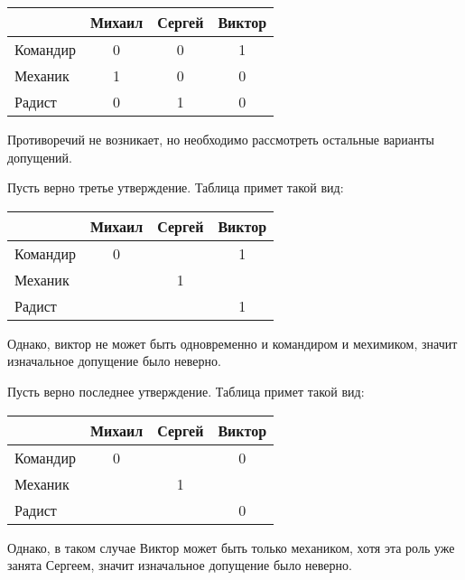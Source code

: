 \documentclass[12pt, a4paper]{article}
\begin{document}
  \begin{tabular}{|l|c|c|c|}
    \hline
             & Михаил & Сергей & Виктор \\ \hline
    Командир & 0      & 0      & 1      \\ \hline
    Механик  & 1      & 0      & 0      \\ \hline
    Радист   & 0      & 1      & 0      \\ \hline
  \end{tabular}

  \rule{0cm}{0.3cm}

  Противоречий не возникает, но необходимо рассмотреть остальные варианты допущений.

  Пусть верно третье утверждение. Таблица примет такой вид:

  \rule{0cm}{0.3cm}

  \begin{tabular}{|l|c|c|c|}
    \hline
             & Михаил & Сергей & Виктор \\ \hline
    Командир & 0      &        & 1      \\ \hline
    Механик  &        & 1      &        \\ \hline
    Радист   &        &        & 1      \\ \hline
  \end{tabular}

  \rule{0cm}{0.3cm}
  
  Однако, виктор не может быть одновременно и командиром и мехимиком, значит изначальное допущение было неверно.

  Пусть верно последнее утверждение. Таблица примет такой вид:

  \rule{0cm}{0.3cm}

  \begin{tabular}{|l|c|c|c|}
    \hline
             & Михаил & Сергей & Виктор \\ \hline
    Командир & 0      &        & 0      \\ \hline
    Механик  &        & 1      &        \\ \hline
    Радист   &        &        & 0      \\ \hline
  \end{tabular}

  \rule{0cm}{0.3cm}

  Однако, в таком случае Виктор может быть только механиком,
  хотя эта роль уже занята Сергеем, значит изначальное допущение было неверно.

  \rule{0cm}{0.3cm}
\end{document}
